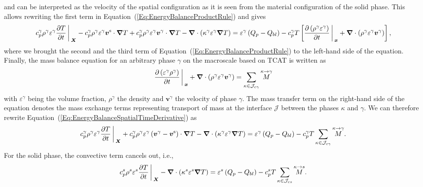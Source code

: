 \documentclass[Times1COL,AMA]{WileyNJDv5} %
\newcommand{\vct}[1]{\boldsymbol{#1}}
\begin{document}
and can be interpreted as the velocity of the spatial configuration as it is seen from the material configuration of the solid phase.
This allows rewriting the first term in Equation~(\ref{Eq:EnergyBalanceProductRule}) and gives
\begin{equation}
    c_{p}^{\gamma} \rho^\gamma \varepsilon^\gamma \frac{\partial T}{\partial t}
    \bigg\arrowvert_{\vct{X}}
    -
    c_{p}^{\gamma} \rho^\gamma \varepsilon^\gamma \vct{v}^\mathrm{s} \cdot  \vct{\nabla} T
    +
    c_{p}^{\gamma} \rho^\gamma \varepsilon^\gamma \vct{v}^\gamma \cdot \vct{\nabla} T
    -
    \vct{\nabla} \cdot \left( \kappa^\gamma \varepsilon^\gamma \vct{\nabla} T \right)
    =
    \varepsilon^\gamma \left(Q_p - Q_{bl}\right)
    -
    c_{p}^{\gamma} T
    \left[
        \frac{\partial \left( \rho^\gamma \varepsilon^\gamma \right)}{\partial t}
        \bigg\arrowvert_{\vct{x}}
        +
        \vct{\nabla} \cdot \left( \rho^\gamma \varepsilon^\gamma \vct{v}^\gamma \right)
        \right]
    ,
    \label{Eq:EnergyBalanceSpatialTimeDerivative}
\end{equation}
where we brought the second and the third term of Equation~(\ref{Eq:EnergyBalanceProductRule}) to the left-hand side of the equation.
Finally, the mass balance equation for an arbitrary phase $\gamma$ on the macroscale based on TCAT is written as
\begin{equation}
    \frac{\partial \left(\varepsilon^\gamma \rho^\gamma \right)}{\partial t} \bigg\arrowvert_{\vct{x}}
    + \vct{\nabla} \cdot \left( \rho^\gamma \varepsilon^\gamma \vct{v}^\gamma \right)
    =
    \sum\limits_{\kappa \in \mathcal{J}_{c\gamma}} \overset{\kappa \rightarrow \gamma}{M}
    \label{Eq:MassBalancePhase}
\end{equation}
with $\varepsilon^\gamma$ being the volume fraction, $\rho^\gamma$ the density and $\vct{v}^\gamma$ the velocity of phase $\gamma$.
The mass transfer term on the right-hand side of the equation denotes the mass exchange terms representing transport of mass at the interface $\mathcal{J}$ between the phases $\kappa$ and $\gamma$.
We can therefore rewrite Equation~(\ref{Eq:EnergyBalanceSpatialTimeDerivative}) as
\begin{equation}
    c_{p}^{\gamma} \rho^\gamma \varepsilon^\gamma \frac{\partial T}{\partial t}
    \bigg\arrowvert_{\vct{X}}
    +
    c_{p}^{\gamma} \rho^\gamma \varepsilon^\gamma \left( \vct{v}^\gamma - \vct{v}^\mathrm{s} \right) \cdot \vct{\nabla} T
    -
    \vct{\nabla} \cdot \left( \kappa^\gamma \varepsilon^\gamma \vct{\nabla} T \right)
    =
    \varepsilon^\gamma \left(Q_p - Q_{bl} \right)
    -
    c_{p}^{\gamma} T
    \sum\limits_{\kappa \in \mathcal{J}_{c\gamma}} \overset{\kappa \rightarrow \gamma}{M}
    .
    \label{Eq:EnergyBalanceSpatialMassBalance}
\end{equation}
For the solid phase, the convective term cancels out, i.e.,
\begin{equation}
    c_{p}^s \rho^s \varepsilon^s \frac{\partial T}{\partial t}
    \bigg\arrowvert_{\vct{X}}
    -
    \vct{\nabla} \cdot \left( \kappa^s \varepsilon^s \vct{\nabla} T \right)
    =
    \varepsilon^s \left(Q_p - Q_{bl} \right)
    -
    c_{p}^s T
    \sum\limits_{\kappa \in \mathcal{J}_{cs}} \overset{\kappa \rightarrow s}{M}
    .
\end{equation}
\end{document}
